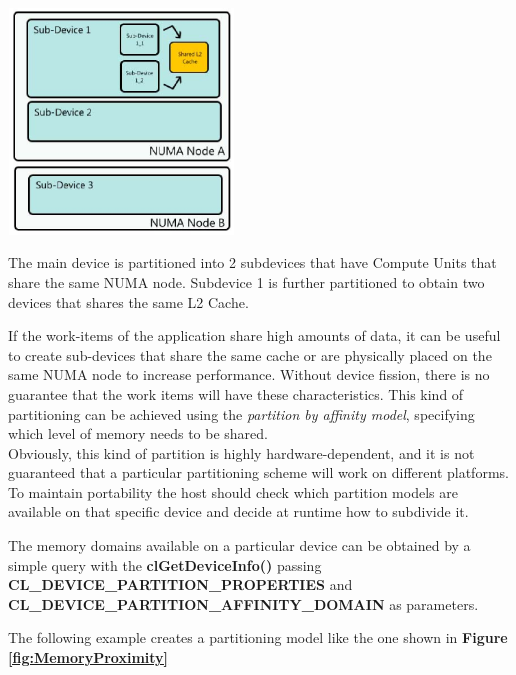 \begin{figurehere}
 \centering
 \includegraphics[width=6cm, height=6cm]{./eps/MemoryProximity.eps}
 \caption{The main device is partitioned into 2 subdevices that have Compute Units that share the same NUMA node. Subdevice 1 is further partitioned to obtain two devices that shares the same L2 Cache.}
 \label{fig:MemoryProximity}
\end{figurehere}

If the work-items of the application share high amounts of data, it can be useful to create sub-devices that share the same cache or are physically placed on the same NUMA node to increase performance.
Without device fission, there is no guarantee that the work items will have these characteristics.
This kind of partitioning can be achieved using the \textit{partition by affinity model}, specifying which level of memory needs to be shared.\\
Obviously, this kind of partition is highly hardware-dependent, and it is not guaranteed that a particular partitioning scheme will work on different platforms. To maintain portability the host should check which partition models are available on that specific device and decide at runtime how to subdivide it. 

\begin{CLCode}
The memory domains available on a particular device can be obtained by a simple query with the \textbf{clGetDeviceInfo()} passing \textbf{CL\_DEVICE\_PARTITION\_PROPERTIES} and \textbf{CL\_DEVICE\_PARTITION\_AFFINITY\_DOMAIN} as parameters.
\label{Code:MemoryDomains}
\end{CLCode}

The following example creates a partitioning model like the one shown in \textbf{Figure \ref{fig:MemoryProximity}}

